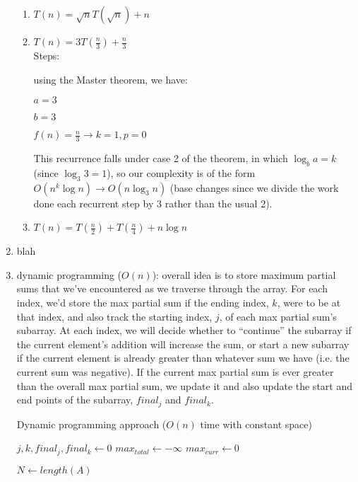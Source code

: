 \documentclass[12pt]{article}
\begin{document}
\begin{enumerate}
\begin{enumerate}
        \item $T(n) = \sqrt{n}T(\sqrt{n}) + n$
        
        \item $T(n) = 3T(\frac{n}{3}) + \frac{n}{3}$ \\
        
        Steps:
        
        using the Master theorem, we have:
        
        $a = 3$
        
        $b = 3$
        
        $f(n) = \frac{n}{3} \longrightarrow k = 1, p = 0$
        
        This recurrence falls under case 2 of the theorem, in which $\log_{b}{a} = k$ (since $\log_{3}{3} = 1$), so our complexity is of the form $O(n^k \log n) \longrightarrow O(n\log_{3}{n})$ (base changes since we divide the work done each recurrent step by 3 rather than the usual 2).\\
        
        \item $T(n) = T(\frac{n}{2}) + T(\frac{n}{4}) + n\log n$
    \end{enumerate}
    \item blah
    \item dynamic programming ($O(n)$):
    overall idea is to store maximum partial sums that we've encountered as we traverse through the array. For each index, we'd store the max partial sum if the ending index, $k$, were to be at that index, and also track the starting index, $j$, of each max partial sum's subarray. At each index, we will decide whether to ``continue'' the subarray if the current element's addition will increase the sum, or start a new subarray if the current element is already greater than whatever sum we have (i.e. the current sum was negative). If the current max partial sum is ever greater than the overall max partial sum, we update it and also update the start and end points of the subarray, $final_j$ and $final_k$.
    \begin{algorithm}
        \caption{Dynamic programming approach ($O(n)$ time with constant space)}
        \begin{algorithmic}
            \State $j, k, final_j, final_k \gets 0$
            \State $max_{total} \gets -\infty$
            \State $max_{curr} \gets 0$
            
            \State $N \gets length(A)$
            

\end{algorithmic}
\end{algorithm}
\end{enumerate}
\end{document}
